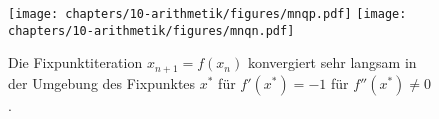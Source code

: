 %
%
%
\begin{figure}
\texttt{[image: chapters/10-arithmetik/figures/mnqp.pdf]}
\texttt{[image: chapters/10-arithmetik/figures/mnqn.pdf]}
\caption{Die Fixpunktiteration $x_{n+1}=f(x_n)$ konvergiert sehr langsam
in der Umgebung des Fixpunktes $x^*$ für
$f'(x^*)=-1$ für $f''(x^*)\ne 0$.
\label{buch:figure:fixpunkt:ablm1}}
\end{figure}

